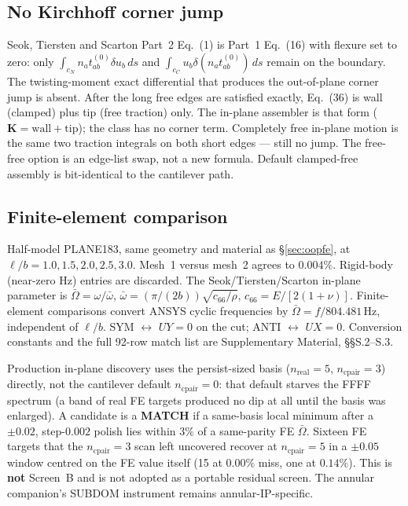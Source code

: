 \documentclass[11pt]{article}
\begin{document}
\subsection{No Kirchhoff corner jump}\label{sec:ip-corner}
Seok, Tiersten and Scarton Part~2 Eq.~(1) is Part~1 Eq.~(16) with flexure
set to zero: only $\int_{c_N} n_a t^{(0)}_{ab}\delta u_b\,ds$ and
$\int_{c_C} u_b\delta(n_a t^{(0)}_{ab})\,ds$ remain on the boundary. The
twisting-moment exact differential that produces the out-of-plane corner
jump is absent. After the long free edges are satisfied exactly, Eq.~(36)
is wall (clamped) plus tip (free traction) only. The in-plane assembler
is that form ($\mathbf{K}=\mathrm{wall}+\mathrm{tip}$); the class has no
corner term. Completely free in-plane motion is the same two traction
integrals on both short edges --- still no jump. The free-free option is
an edge-list swap, not a new formula. Default clamped-free assembly is
bit-identical to the cantilever path.

\subsection{Finite-element comparison}\label{sec:ipfe}
Half-model PLANE183, same geometry and material as \S\ref{sec:oopfe}, at
$\ell/b=1.0,1.5,2.0,2.5,3.0$. Mesh~1 versus mesh~2 agrees to $0.004\%$.
Rigid-body (near-zero Hz) entries are discarded. The
Seok/Tiersten/Scarton in-plane parameter is
$\bar\Omega=\omega/\bar\omega$,
$\bar\omega=(\pi/(2b))\sqrt{c_{66}/\rho}$,
$c_{66}=E/[2(1+\nu)]$. Finite-element comparisons convert ANSYS cyclic
frequencies by $\bar\Omega=f/804.481\,\mathrm{Hz}$, independent of
$\ell/b$. SYM $\leftrightarrow$ $UY=0$ on the cut; ANTI
$\leftrightarrow$ $UX=0$. Conversion constants and the full 92-row match
list are Supplementary Material, \S\S{}S.2--S.3.

Production in-plane discovery uses the persist-sized basis
($n_{\mathrm{real}}=5$, $n_{\mathrm{cpair}}=3$) directly, not the
cantilever default $n_{\mathrm{cpair}}=0$: that default starves the FFFF
spectrum (a band of real FE targets produced no dip at all until the
basis was enlarged). A candidate is a \textbf{MATCH} if a same-basis
local minimum after a $\pm 0.02$, step-$0.002$ polish lies within $3\%$
of a same-parity FE $\bar\Omega$. Sixteen FE targets that the
$n_{\mathrm{cpair}}=3$ scan left uncovered recover at
$n_{\mathrm{cpair}}=5$ in a $\pm 0.05$ window centred on the FE value
itself (15 at $0.00\%$ miss, one at $0.14\%$). This is \textbf{not}
Screen~B and is not adopted as a portable residual screen. The annular
companion's SUBDOM instrument \cite{mccune2026annular} remains
annular-IP-specific.
\end{document}
